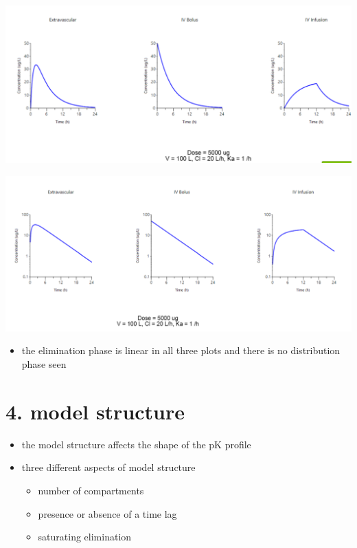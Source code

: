 \documentclass[
  letterpaper,
  DIV=11,
  numbers=noendperiod]{scrreprt}
\providecommand{\tightlist}{%
  \setlength{\itemsep}{0pt}\setlength{\parskip}{0pt}}\usepackage{longtable,booktabs,array}
\begin{document}
\includegraphics{./img/admin-2.png}

\includegraphics{./img/admin-3.png}

\begin{itemize}
\tightlist
\item
  the elimination phase is linear in all three plots and there is no
  distribution phase seen
\end{itemize}

\hypertarget{model-structure}{%
\section{4. model structure}\label{model-structure}}

\begin{itemize}
\tightlist
\item
  the model structure affects the shape of the pK profile
\item
  three different aspects of model structure

  \begin{itemize}
  \tightlist
  \item
    number of compartments
  \item
    presence or absence of a time lag
  \item
    saturating elimination
  \end{itemize}
\end{itemize}
\end{document}
